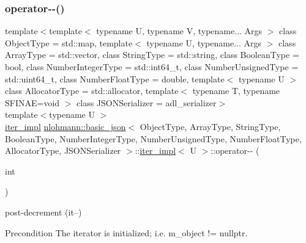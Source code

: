 \subsubsection{\texorpdfstring{operator-\/-\/()}{operator--()}\hspace{0.1cm}{\footnotesize\ttfamily [1/2]}}
{\footnotesize\ttfamily template$<$template$<$ typename U, typename V, typename... Args $>$ class Object\+Type = std\+::map, template$<$ typename U, typename... Args $>$ class Array\+Type = std\+::vector, class String\+Type  = std\+::string, class Boolean\+Type  = bool, class Number\+Integer\+Type  = std\+::int64\+\_\+t, class Number\+Unsigned\+Type  = std\+::uint64\+\_\+t, class Number\+Float\+Type  = double, template$<$ typename U $>$ class Allocator\+Type = std\+::allocator, template$<$ typename T, typename S\+F\+I\+N\+A\+E=void $>$ class J\+S\+O\+N\+Serializer = adl\+\_\+serializer$>$ \\
template$<$typename U $>$ \\
\hyperlink{classnlohmann_1_1basic__json_1_1iter__impl}{iter\+\_\+impl} \hyperlink{classnlohmann_1_1basic__json}{nlohmann\+::basic\+\_\+json}$<$ Object\+Type, Array\+Type, String\+Type, Boolean\+Type, Number\+Integer\+Type, Number\+Unsigned\+Type, Number\+Float\+Type, Allocator\+Type, J\+S\+O\+N\+Serializer $>$\+::\hyperlink{classnlohmann_1_1basic__json_1_1iter__impl}{iter\+\_\+impl}$<$ U $>$\+::operator-\/-\/ (\begin{DoxyParamCaption}\item[{int}]{ }\end{DoxyParamCaption})\hspace{0.3cm}{\ttfamily [inline]}}



post-\/decrement (it--) 

\begin{DoxyPrecond}{Precondition}
The iterator is initialized; i.\+e. {\ttfamily m\+\_\+object != nullptr}. 
\end{DoxyPrecond}
\mbox{\label{classnlohmann_1_1basic__json_1_1iter__impl_a50c5d20f733bfe2b13d67366102ba3fe}} 
